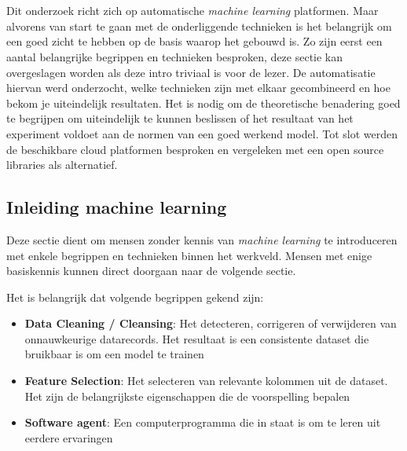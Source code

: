 \chapter{}
\label{ch:stand-van-zaken}



Dit onderzoek richt zich op automatische \textit{machine learning} platformen. Maar alvorens van start te gaan met de onderliggende technieken is het belangrijk om een goed zicht te hebben op de basis waarop het gebouwd is. Zo zijn eerst een aantal belangrijke begrippen en technieken besproken, deze sectie kan overgeslagen worden als deze intro triviaal is voor de lezer. De automatisatie hiervan werd onderzocht, welke technieken zijn met elkaar gecombineerd en hoe bekom je uiteindelijk resultaten. Het is nodig om de theoretische benadering goed te begrijpen om uiteindelijk te kunnen beslissen of het resultaat van het experiment voldoet aan de normen van een goed werkend model. Tot slot werden de beschikbare cloud platformen besproken en vergeleken met een open source libraries als alternatief.

\section{Inleiding machine learning}
\label{sec:inl-machine-learning}

Deze sectie dient om mensen zonder kennis van \textit{machine learning} te introduceren met enkele begrippen en technieken binnen het werkveld. Mensen met enige basiskennis kunnen direct doorgaan naar de volgende sectie.

Het is belangrijk dat volgende begrippen gekend zijn:
\begin{itemize}
    \item \textbf{Data Cleaning / Cleansing}: Het detecteren, corrigeren of verwijderen van onnauwkeurige datarecords. Het resultaat is een consistente dataset die bruikbaar is om een model te trainen
    \item \textbf{Feature Selection}: Het selecteren van relevante kolommen uit de dataset. Het zijn de belangrijkste eigenschappen die de voorspelling bepalen
    \item \textbf{Software agent}: Een computerprogramma die in staat is om te leren uit eerdere ervaringen
\end{itemize}

